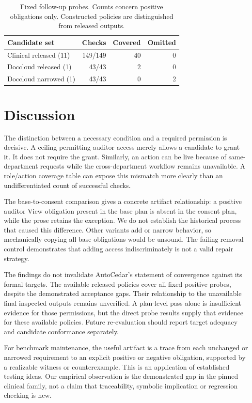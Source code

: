 \documentclass[sigconf,nonacm]{acmart}
\begin{document}
\begin{table}[t]
\centering\small\setlength{\tabcolsep}{3pt}
\caption{Fixed follow-up probes. Counts concern positive obligations only. Constructed policies are distinguished from released outputs.}
\label{tab:followup}
\begin{tabular}{lrrr}
\toprule Candidate set & Checks & Covered & Omitted\\\midrule
Clinical released (11) & 149/149 & 40 & 0 \\
Doccloud released (1) & 43/43 & 2 & 0 \\
Doccloud narrowed (1) & 43/43 & 0 & 2 \\
\bottomrule
\end{tabular}
\end{table}

\section{Discussion}
The distinction between a necessary condition and a required permission is decisive. A ceiling permitting auditor access merely allows a candidate to grant it. It does not require the grant. Similarly, an action can be live because of same-department requests while the cross-department workflow remains unavailable. A role/action coverage table can expose this mismatch more clearly than an undifferentiated count of successful checks.

The base-to-consent comparison gives a concrete artifact relationship: a positive auditor View obligation present in the base plan is absent in the consent plan, while the prose retains the exception. We do not establish the historical process that caused this difference. Other variants add or narrow behavior, so mechanically copying all base obligations would be unsound. The failing removal control demonstrates that adding access indiscriminately is not a valid repair strategy.

The findings do not invalidate AutoCedar's statement of convergence against its formal targets. The available released policies cover all fixed positive probes, despite the demonstrated acceptance gaps. Their relationship to the unavailable final inspected outputs remains unverified. A plan-level pass alone is insufficient evidence for those permissions, but the direct probe results supply that evidence for these available policies. Future re-evaluation should report target adequacy and candidate conformance separately.

For benchmark maintenance, the useful artifact is a trace from each unchanged or narrowed requirement to an explicit positive or negative obligation, supported by a realizable witness or counterexample. This is an application of established testing ideas. Our empirical observation is the demonstrated gap in the pinned clinical family, not a claim that traceability, symbolic implication or regression checking is new.
\end{document}
